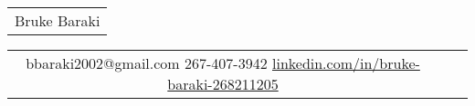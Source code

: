 \documentclass[7pt]{article}
\begin{document}
\pagestyle{empty} 

\begin{tabularx}{\linewidth}{@{} C @{}}
\huge{Bruke Baraki} \\[6pt]
\end{tabularx}
\begin{tabularx}{\linewidth}{@{} C @{} C @{} C}
{{\raisebox{-0.05\height}{\faEnvelope} 
bbaraki2002@gmail.com}} 
{{\raisebox{-0.05\height}{\faMobile} 267-407-3942}} 
{{\href{linkedin.com/in/bruke-baraki-268211205}{\raisebox{-0.05\height}{\faLinkedin} linkedin.com/in/bruke-baraki-268211205}}}
\end{tabularx}










\end{document}
